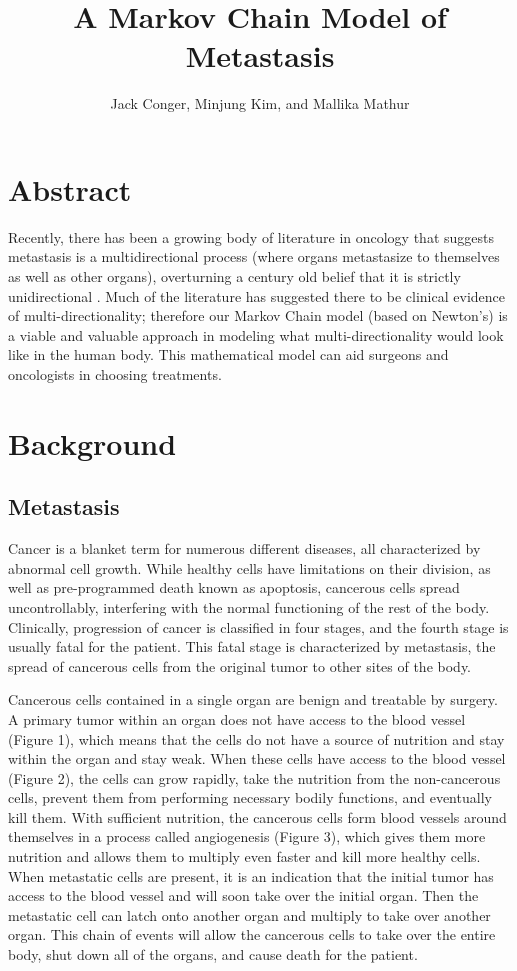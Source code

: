 \documentclass[letterpaper,12pt]{article}
\title{A Markov Chain Model of Metastasis}
\author{Jack Conger, Minjung Kim, and Mallika Mathur}
\begin{document}
\maketitle

\section{Abstract}

Recently, there has been a growing body of literature in oncology that suggests metastasis is a multidirectional process (where organs metastasize to themselves as well as other organs), overturning a century old belief that it is strictly unidirectional . Much of the literature has suggested there to be clinical evidence of multi-directionality; therefore our Markov Chain model (based on Newton’s) is a viable and valuable approach in modeling what multi-directionality would look like in the human body. This mathematical model can aid surgeons and oncologists in choosing treatments.

\section{Background}

\subsection{Metastasis} %

Cancer is a blanket term for numerous different diseases, all characterized by abnormal cell growth. While healthy cells have limitations on their division, as well as pre-programmed death known as apoptosis, cancerous cells spread uncontrollably, interfering with the normal functioning of the rest of the body. Clinically, progression of cancer is classified in four stages, and the fourth stage is usually fatal for the patient. This fatal stage is characterized by metastasis, the spread of cancerous cells from the original tumor to other sites of the body. 

Cancerous cells contained in a single organ are benign and treatable by surgery. A primary tumor within an organ does not have access to the blood vessel (Figure 1), which means that the cells do not have a source of nutrition and stay within the organ and stay weak. When these cells have access to the blood vessel (Figure 2), the cells can grow rapidly, take the nutrition from the non-cancerous cells, prevent them from performing necessary bodily functions, and eventually kill them. With sufficient nutrition, the cancerous cells form blood vessels around themselves in a process called angiogenesis (Figure 3), which gives them more nutrition and allows them to multiply even faster and kill more healthy cells. When metastatic cells are present, it is an indication that the initial tumor has access to the blood vessel and will soon take over the initial organ. Then the metastatic cell can latch onto another organ and multiply to take over another organ. This chain of events will allow the cancerous cells to take over the entire body, shut down all of the organs, and cause death for the patient. 
\end{document}
